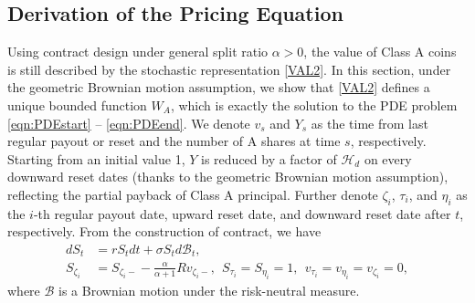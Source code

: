 \documentclass[draft, noinfoline]{ectaart}
\numberwithin{equation}{section}
\theoremstyle{plain}
\begin{document}
\begin{appendices}

\section{Derivation of the Pricing Equation}
Using contract design under general split ratio $\alpha>0$, the value of Class A coins is still described by the stochastic representation \eqref{VAL2}. In this section, under the geometric Brownian motion assumption, we show that \eqref{VAL2} defines a unique bounded function $W_A$, which is exactly the solution to the PDE problem \eqref{eqn:PDEstart} -- \eqref{eqn:PDEend}. We denote $v_s$ and $Y_s$ as the time from last regular payout or reset and the number of A shares at time $s$, respectively. Starting from an initial value 1, $Y$ is reduced by a factor of $\mathcal{H}_d$ on every downward reset dates (thanks to the geometric Brownian motion assumption), reflecting the partial payback of Class A principal. Further denote $\zeta_i$, $\tau_i$, and $\eta_i$ as the $i$-th regular payout date, upward reset date, and downward reset date after $t$, respectively. From the construction of contract, we have
\begin{align*}
dS_t &= rS_tdt+\sigma S_td\mathcal{B}_t,\\
S_{\zeta_i}&=S_{\zeta_i-}-\frac{\alpha}{\alpha+1}Rv_{\zeta_i-},~~ S_{\tau_i}=S_{\eta_i}=1, ~~v_{\tau_i}=v_{\eta_i}=v_{\zeta_i}=0,
\end{align*}
where $\mathcal{B}$ is a Brownian motion under the risk-neutral measure.


\end{appendices}
\end{document}
